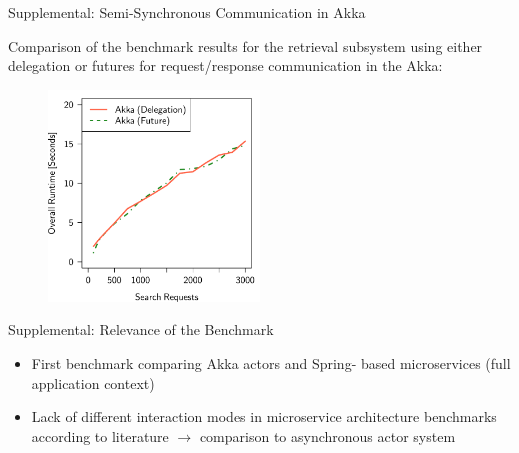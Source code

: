 \documentclass{beamer}
\begin{document}
\begin{frame}{Supplemental: Semi-Synchronous Communication in Akka}

Comparison of the benchmark results for the retrieval subsystem using either delegation or futures for request/response communication in the Akka:

\begin{center}
  \begin{figure} 
    \includegraphics[width=0.5\textwidth]{graphics/eval-search-comparison-akka-delegation-future.pdf} 
  \end{figure}
\end{center}

\end{frame}


\begin{frame}{Supplemental: Relevance of the Benchmark}

\begin{itemize}
  \item First benchmark comparing Akka actors and Spring- based microservices (full application context)
  \item Lack of different interaction modes in microservice architecture benchmarks according to literature $\rightarrow$ comparison to asynchronous actor system
\end{itemize}

\end{frame}

\end{document}
